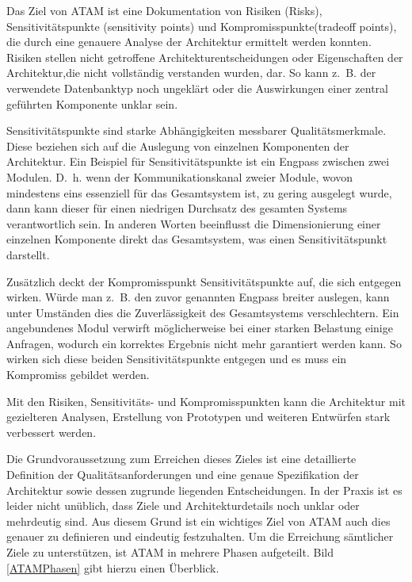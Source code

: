 Das Ziel von \ac{ATAM} ist eine Dokumentation von Risiken (Risks), Sensitivitätspunkte (sensitivity points) und Kompromisspunkte(tradeoff points), die durch eine genauere Analyse der Architektur\cite{Clements2000}
ermittelt werden konnten. 
Risiken stellen nicht getroffene Architekturentscheidungen oder Eigenschaften der Architektur,die nicht vollständig
verstanden wurden, dar. So kann z.~B. der verwendete Datenbanktyp noch ungeklärt oder die Auswirkungen einer zentral geführten Komponente unklar sein.

Sensitivitätspunkte sind starke Abhängigkeiten messbarer Qualitätsmerkmale. Diese beziehen sich auf die Auslegung von einzelnen Komponenten der Architektur. Ein Beispiel für Sensitivitätspunkte ist ein Engpass zwischen zwei Modulen. D.~h. wenn der Kommunikationskanal zweier Module, wovon mindestens eins essenziell für das Gesamtsystem ist, zu gering ausgelegt wurde, dann kann dieser für einen niedrigen Durchsatz des gesamten Systems verantwortlich sein. In anderen Worten beeinflusst die Dimensionierung einer einzelnen Komponente direkt das Gesamtsystem, was einen Sensitivitätspunkt darstellt.

Zusätzlich deckt der Kompromisspunkt Sensitivitätspunkte auf, die sich entgegen wirken.
Würde man z.~B. den zuvor genannten Engpass breiter auslegen, kann unter Umständen dies die Zuverlässigkeit des Gesamtsystems verschlechtern. Ein angebundenes Modul verwirft möglicherweise bei einer starken Belastung einige Anfragen, wodurch ein korrektes Ergebnis nicht mehr garantiert werden kann. So wirken sich diese beiden Sensitivitätspunkte entgegen und es muss ein Kompromiss gebildet werden.  
 
Mit den Risiken, Sensitivitäts- und Kompromisspunkten kann die Architektur mit gezielteren Analysen, Erstellung von Prototypen und weiteren Entwürfen stark verbessert 
werden. 

Die Grundvoraussetzung zum Erreichen dieses Zieles ist eine detaillierte Definition der Qualitätsanforderungen und eine genaue Spezifikation der Architektur sowie
dessen zugrunde liegenden Entscheidungen\cite{Clements2000}. In der Praxis ist es leider nicht unüblich, dass Ziele und Architekturdetails noch unklar oder mehrdeutig sind. Aus diesem Grund ist ein wichtiges Ziel von \ac{ATAM} auch dies genauer zu definieren und eindeutig festzuhalten. Um die Erreichung sämtlicher Ziele zu unterstützen, ist \ac{ATAM} in 
mehrere Phasen aufgeteilt. Bild \ref{ATAMPhasen} gibt hierzu einen Überblick.


